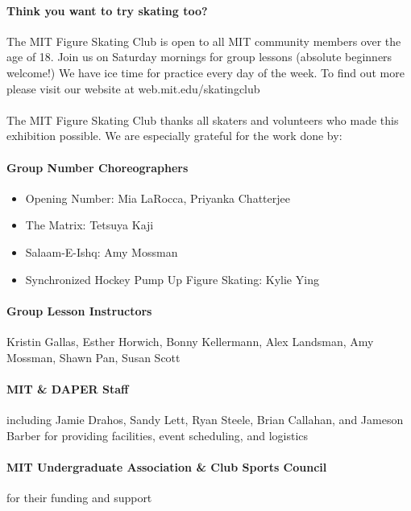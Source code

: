\documentclass[12pt]{article}
\begin{document}
\begin{multicols*}{2}


\paragraph{Think you want to try skating too?} The MIT Figure Skating Club is open to all MIT community members over the age of 18. Join us on Saturday mornings for group lessons (absolute beginners welcome!) We have ice time for practice every day of the week. To find out more please visit our website at web.mit.edu/skatingclub

\paragraph{} The MIT Figure Skating Club thanks all skaters and volunteers who made this exhibition possible. We are especially grateful for the work done by:

\paragraph{Group Number Choreographers}
\begin{itemize}
    \item Opening Number: Mia LaRocca, Priyanka Chatterjee
    \item The Matrix: Tetsuya Kaji
    \item Salaam-E-Ishq: Amy Mossman
    \item Synchronized Hockey Pump Up Figure Skating: Kylie Ying
\end{itemize}

\paragraph{Group Lesson Instructors} Kristin Gallas, Esther Horwich, Bonny Kellermann, Alex Landsman, Amy Mossman, Shawn Pan, Susan Scott
\paragraph{MIT \& DAPER Staff} including Jamie Drahos, Sandy Lett, Ryan Steele, Brian Callahan, and Jameson Barber for providing facilities, event scheduling, and logistics
\paragraph{MIT Undergraduate Association \& Club Sports Council} for their funding and support


\end{multicols*}
\end{document}
